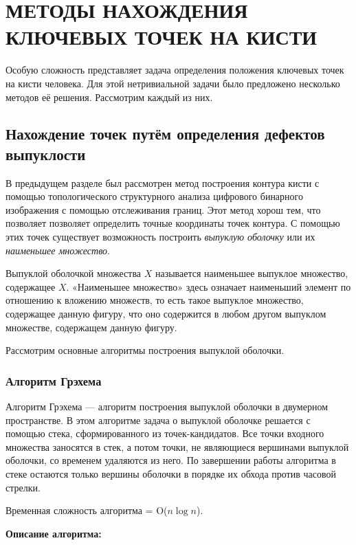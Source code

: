 \section{\centering МЕТОДЫ НАХОЖДЕНИЯ КЛЮЧЕВЫХ ТОЧЕК НА КИСТИ}

Особую сложность представляет задача 
определения положения ключевых точек на кисти человека.
Для этой нетривиальной задачи было предложено
несколько методов её решения. Рассмотрим каждый из них.

\subsection{Нахождение точек путём определения дефектов 
выпуклости}

В предыдущем разделе был рассмотрен метод построения контура
кисти с помощью топологического структурного анализа
цифрового бинарного изображения с помощью отслеживания
границ. Этот метод хорош тем, что позволяет позволяет
определить точные координаты точек контура. С помощью этих
точек существует возможность построить {\it выпуклую
оболочку} или их {\it наименьшее множество}.

Выпуклой оболочкой множества $X$ называется наименьшее
выпуклое множество, содержащее $X$. 
«Наименьшее множество» здесь означает наименьший элемент по
отношению к вложению множеств, то есть такое выпуклое
множество, содержащее данную фигуру, что оно содержится в
любом другом выпуклом множестве, содержащем данную фигуру.

Рассмотрим основные алгоритмы построения выпуклой оболочки.

\subsubsection{Алгоритм Грэхема}

Алгоритм Грэхема\cite{graham} — алгоритм построения выпуклой
оболочки в двумерном пространстве. В этом алгоритме задача о
выпуклой оболочке решается с помощью стека, сформированного
из точек-кандидатов. Все точки входного множества заносятся в
стек, а потом точки, не являющиеся вершинами выпуклой
оболочки, со временем удаляются из него. По завершении работы
алгоритма в стеке остаются только вершины оболочки в порядке
их обхода против часовой стрелки.

Временная сложность алгоритма = O($n\log{n}$).

{\bf Описание алгоритма:}

